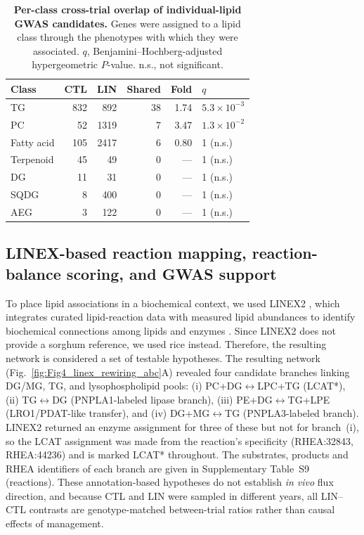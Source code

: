 \documentclass[9pt,twocolumn,twoside]{rilabRxiv}
\begin{document}
\begin{table}[!ht]
\centering
\caption{\textbf{Per-class cross-trial overlap of individual-lipid GWAS candidates.} Genes were assigned to a lipid class through the phenotypes with which they were associated. $q$, Benjamini--Hochberg-adjusted hypergeometric $P$-value. n.s., not significant.}
\label{tab:overlap_class}
\small
\begin{tabular}{lrrrrl}
\toprule
\textbf{Class} & \textbf{CTL} & \textbf{LIN} & \textbf{Shared} & \textbf{Fold} & \textbf{$q$} \\
\midrule
TG          & 832 &  892 & 38 & 1.74 & $5.3\times10^{-3}$ \\
PC          &  52 & 1319 &  7 & 3.47 & $1.3\times10^{-2}$ \\
Fatty acid  & 105 & 2417 &  6 & 0.80 & 1 (n.s.) \\
Terpenoid   &  45 &   49 &  0 & ---  & 1 (n.s.) \\
DG          &  11 &   31 &  0 & ---  & 1 (n.s.) \\
SQDG        &   8 &  400 &  0 & ---  & 1 (n.s.) \\
AEG         &   3 &  122 &  0 & ---  & 1 (n.s.) \\
\bottomrule
\end{tabular}
\end{table}

\subsection*{LINEX-based reaction mapping, reaction-balance scoring, and GWAS support}

To place lipid associations in a biochemical context, we used LINEX2 \citep{Rose2023LINEX2}, which integrates curated lipid-reaction data with measured lipid abundances to identify biochemical connections among lipids and enzymes \citep{Morgat2016Rhea}. Since LINEX2 does not provide a sorghum reference, we used rice instead. Therefore, the resulting network is considered a set of testable hypotheses. The resulting network (Fig.~\ref{fig:Fig4_linex_rewiring_abc}A) revealed four candidate branches linking DG/MG, TG, and lysophospholipid pools: (i) PC+DG$\leftrightarrow$LPC+TG (LCAT*), (ii) TG$\leftrightarrow$DG (PNPLA1-labeled lipase branch), (iii) PE+DG$\leftrightarrow$TG+LPE (LRO1/PDAT-like transfer), and (iv) DG+MG$\leftrightarrow$TG (PNPLA3-labeled branch). LINEX2 returned an enzyme assignment for three of these but not for branch~(i), so the LCAT assignment was made from the reaction's specificity (RHEA:32843, RHEA:44236) and is marked LCAT* throughout. The substrates, products and RHEA identifiers of each branch are given in Supplementary Table~S9 (reactions). These annotation-based hypotheses do not establish \emph{in vivo} flux direction, and because CTL and LIN were sampled in different years, all LIN--CTL contrasts are genotype-matched between-trial ratios rather than causal effects of management.
\end{document}
